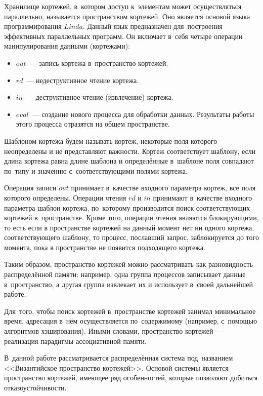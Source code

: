 Хранилище кортежей, в~котором доступ к~элементам может осуществляться параллельно, называется пространством кортежей. Оно является основой языка программирования $Linda$. Данный язык предназначен для~построения эффективных параллельных программ. Он включает в~себя четыре операции манипулирования данными (кортежами):
\begin{itemize}
	\item $out$~--- запись кортежа в~пространство кортежей.
	\item $rd$~--- недеструктивное чтение кортежа.
	\item $in$~--- деструктивное чтение (извлечение) кортежа.
	\item $eval$~--- создание нового процесса для обработки данных. Результаты работы этого процесса отразятся на общем пространстве.
\end{itemize}

Шаблоном кортежа будем называть кортеж, некоторые поля которого неопределены и не представляют важности. Кортеж соответствует шаблону, если длина кортежа равна длине шаблона и определённые в~шаблоне поля совпадают по~типу и значению с~соответствующими полями кортежа.

Операция записи $out$ принимает в~качестве входного параметра кортеж, все поля которого определены. Операции чтения $rd$ и $in$ принимают в~качестве входного параметра шаблон кортежа, по~которому производится поиск соответствующих кортежей в~пространстве. Кроме того, операции чтения являются блокирующими, то есть если в пространстве кортежей на данный момент нет ни одного кортежа, соответствующего шаблону, то процесс, пославший запрос, заблокируется до того момента, пока в пространстве не появится подходящего кортежа.

Таким образом, пространство кортежей можно рассматривать как разновидность распределённой памяти: например, одна группа процессов записывает данные в~пространство, а другая группа извлекает их и использует в~своей дальнейшей работе.

Для~того, чтобы поиск кортежей в~пространстве кортежей занимал минимальное время, адресация в~нём осуществляется по~содержимому (например, с~помощью алгоритмов хэширования). Иными словами, пространство кортежей~--- реализация парадигмы ассоциативной памяти.

В~данной работе рассматривается распределённая система под~названием <<Византийское пространство кортежей>>. Основой системы является пространство кортежей, имеющее ряд особенностей, которые позволяют добиться отказоустойчивости.


